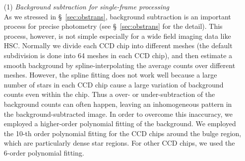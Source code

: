 \documentclass[iop, apj]{emulateapj}
\newcommand{\?}{\stackrel{?}{=}}
\begin{document}
\begin{itemize}
\item[(1)]{\it Background subtraction for single-frame processing}\\
\label{sec:back6d}
As we stressed in \S~\ref{sec:obstrans}, 
background subtraction is an important process for precise photometry (see \S~\ref{sec:obstrans} for the detail). 
This process, however, is not simple especially for a wide field imaging data like HSC. Normally we divide each CCD chip into different meshes (the default subdivision is done into 64 meshes in each CCD chip), and then estimate a smooth background by spline-interpolating the average counts over different meshes. However, the spline fitting does not work well because a large number of stars in each CCD chip cause a large variation of background counts even within the chip. Thus a over- or under-subtraction of the background counts can often happen, leaving an inhomogeneous pattern in the background-subtracted image. %
In order to overcome this inaccuracy, we employed a higher-order polynomial fitting of the background. We employed the 10-th order polynomial fitting for the CCD chips around the bulge region, which are particularly dense star regions. For other CCD chips, we used the 6-order polynomial fitting. 


\end{itemize}
\end{document}
